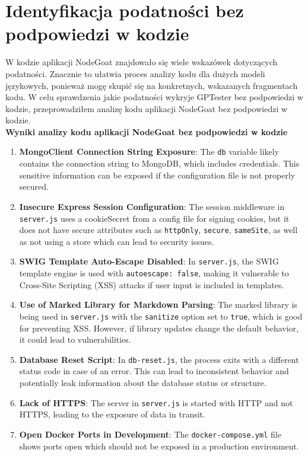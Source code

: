 \section{Identyfikacja podatności bez podpowiedzi w kodzie}
W kodzie aplikacji NodeGoat znajdowało się wiele wskazówek dotyczących podatności. Znacznie to ułatwia proces analizy kodu dla dużych modeli językowych, ponieważ mogę skupić się na konkretnych, wskazanych fragmentach kodu. W celu sprawdzenia jakie podatności wykryje GPTester bez podpowiedzi w kodzie, przeprowadziłem analizę kodu aplikacji NodeGoat bez podpowiedzi w kodzie. \\

{\large\textbf{Wyniki analizy kodu aplikacji NodeGoat bez podpowiedzi w kodzie}}
\normalsize
\begin{enumerate}
    \item \textbf{MongoClient Connection String Exposure}: The \texttt{db} variable likely contains the connection string to MongoDB, which includes credentials. This sensitive information can be exposed if the configuration file is not properly secured.
    \item \textbf{Insecure Express Session Configuration}: The session middleware in \texttt{server.js} uses a cookieSecret from a config file for signing cookies, but it does not have secure attributes such as \texttt{httpOnly}, \texttt{secure}, \texttt{sameSite}, as well as not using a store which can lead to security issues.
    \item \textbf{SWIG Template Auto-Escape Disabled}: In \texttt{server.js}, the SWIG template engine is used with \texttt{autoescape: false}, making it vulnerable to Cross-Site Scripting (XSS) attacks if user input is included in templates.
    \item \textbf{Use of Marked Library for Markdown Parsing}: The marked library is being used in \texttt{server.js} with the \texttt{sanitize} option set to \texttt{true}, which is good for preventing XSS. However, if library updates change the default behavior, it could lead to vulnerabilities.
    \item \textbf{Database Reset Script}: In \texttt{db-reset.js}, the process exits with a different status code in case of an error. This can lead to inconsistent behavior and potentially leak information about the database status or structure.
    \item \textbf{Lack of HTTPS}: The server in \texttt{server.js} is started with HTTP and not HTTPS, leading to the exposure of data in transit.
    \item \textbf{Open Docker Ports in Development}: The \texttt{docker-compose.yml} file shows ports open which should not be exposed in a production environment.

\end{enumerate}
